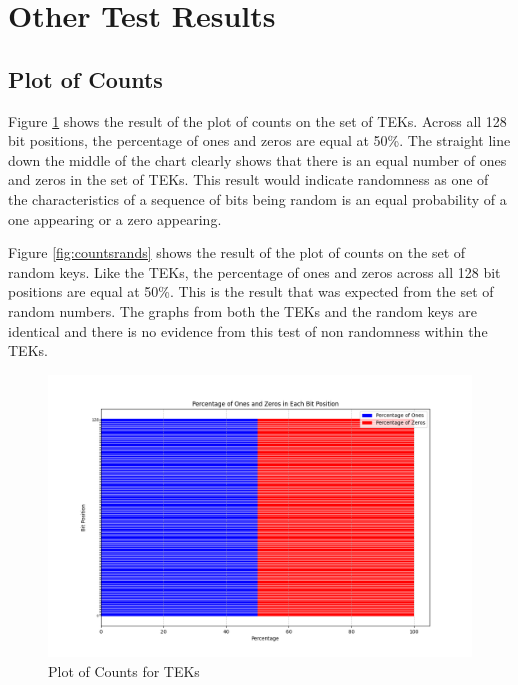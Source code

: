 \section{Other Test Results}

\subsection{Plot of Counts}

Figure \ref{fig:countsteks} shows the result of the plot of counts on the set of TEKs. Across all 128 bit positions, the percentage of ones and zeros are equal at 50\%. The straight line down the middle of the chart clearly shows that there is an equal number of ones and zeros in the set of TEKs. This result would indicate randomness as one of the characteristics of a sequence of bits being random is an equal probability of a one appearing or a zero appearing. \newline

Figure \ref{fig:countsrands} shows the result of the plot of counts on the set of random keys. Like the TEKs, the percentage of ones and zeros across all 128 bit positions are equal at 50\%. This is the result that was expected from the set of random numbers. The graphs from both the TEKs and the random keys are identical and there is no evidence from this test of non randomness within the TEKs.

\begin{figure}[H]
\centering
\includegraphics[width=1\textwidth]{final0s1sboth.png}
\caption{Plot of Counts for TEKs}
\label{fig:countsteks}
\end{figure}

